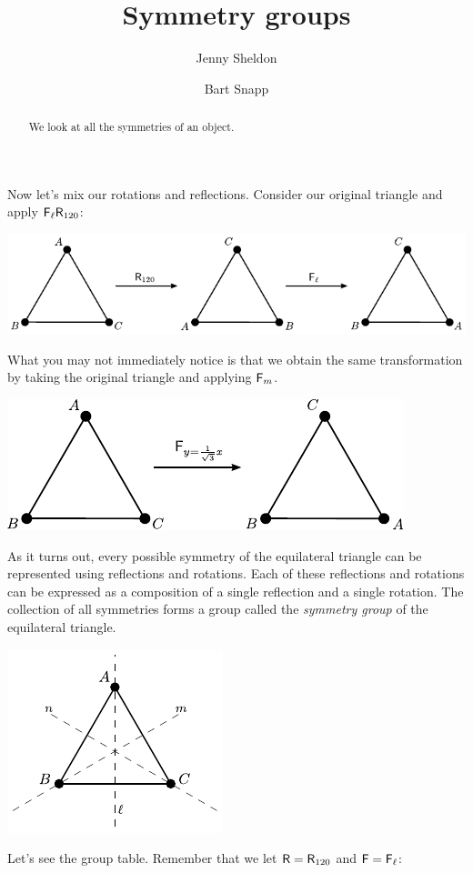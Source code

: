 \documentclass{ximera}
\author{Jenny Sheldon \and Bart Snapp}
\title{Symmetry groups}
\begin{document}
\begin{abstract}
  We look at all the symmetries of an object.
\end{abstract}
\maketitle


Now let's mix our rotations and reflections.  Consider our original
triangle and apply $\mathsf{F}_\ell \mathsf{R}_{120}$:
\begin{image}
\includegraphics{symTriComp1.pdf}
\end{image}
What you may not immediately notice is that we obtain the same
transformation by taking the original triangle and applying
$\mathsf{F}_m$.
\begin{image}
\includegraphics{symTriComp2.pdf}
\end{image}



As it turns out, every possible symmetry of the equilateral triangle
can be represented using reflections and rotations.  Each of these
reflections and rotations can be expressed as a composition of a
single reflection and a single rotation.  The collection of all
symmetries forms a group called the \textit{symmetry group} of the equilateral triangle. 
\begin{image}
\includegraphics{symTriRef.pdf}
\end{image}
Let's see the group table.  Remember that we let $\mathsf{R} = \mathsf{R}_{120}$
and $\mathsf{F} = \mathsf{F}_{\ell}$:
\end{document}
